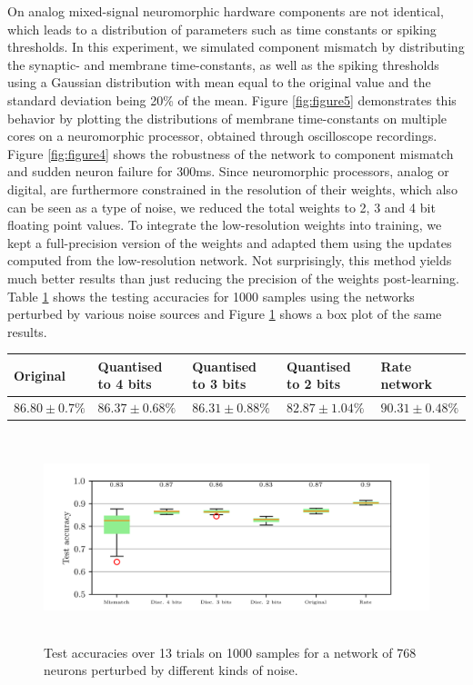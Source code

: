 \documentclass[twoside,11pt,titlepage]{article}
\begin{document}
On analog mixed-signal neuromorphic hardware components are not identical, which leads to a distribution
of parameters such as time constants or spiking thresholds. In this experiment, we simulated component mismatch by
distributing the synaptic- and membrane time-constants, as well as the spiking thresholds using a Gaussian distribution with mean
equal to the original value and the standard deviation being 20\% of the mean. Figure \ref{fig:figure5} demonstrates this behavior by plotting
the distributions of membrane time-constants on multiple cores on a neuromorphic processor, obtained through oscilloscope recordings.
Figure \ref{fig:figure4} shows the robustness of the network to component mismatch and sudden neuron failure for 300ms. Since neuromorphic
processors, analog or digital, are furthermore constrained in the resolution of their weights, which also can be seen as a type of noise,
we reduced the total weights to 2, 3 and 4 bit floating point values. To integrate the low-resolution weights into training, we kept a
full-precision version of the weights and adapted them using the updates computed from the low-resolution network. Not surprisingly,
this method yields much better results than just reducing the precision of the weights post-learning. Table \ref{table:table1} shows the
testing accuracies for 1000 samples using the networks perturbed by various noise sources and Figure \ref{fig:figure7} shows a box plot of
the same results.

\begin{table}[!htb]
  \begin{adjustbox}{center}
  \begin{tabular}{|l|l|l|l|l|}
  \hline
  {Original} & {Quantised to 4 bits} & {Quantised to 3 bits} & {Quantised to 2 bits} & {Rate network} \\
  \hline
  {$86.80 \pm 0.7\%$}  & {$86.37 \pm 0.68\%$}  & {$86.31 \pm 0.88\%$}  & {$82.87 \pm 1.04\%$}  & {$90.31 \pm 0.48\%$}       \\
  \hline
  \end{tabular}
\end{adjustbox}
\label{table:table1}
\end{table}

\begin{figure}[!htb]
  \includegraphics[width = \columnwidth, height=6cm]{figures/figure7.png}
  \caption{Test accuracies over 13 trials on 1000 samples for a network of 768 neurons perturbed by different kinds of noise.}
  \label{fig:figure7}
\end{figure}
\end{document}
